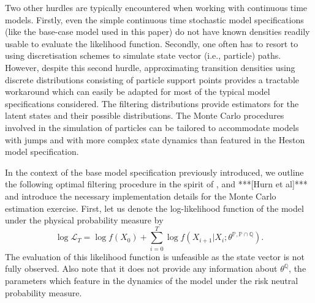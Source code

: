 \documentclass[11pt,a4paper,notitlepage]{article}
\numberwithin{equation}{section}
\begin{document}
Two other hurdles are typically encountered when working with continuous time models. Firstly, even the simple continuous time stochastic model specifications (like the base-case model used in this paper) do not have known densities readily usable to evaluate the likelihood function. Secondly, one often has to resort to using discretisation schemes to simulate state vector (i.e., particle) paths. However, despite this second hurdle, approximating transition densities using discrete distributions consisting of particle support points provides a tractable workaround which can easily be adapted for most of the typical model specifications considered. The filtering distributions provide estimators for the latent states and their possible distributions. The Monte Carlo procedures involved in the simulation of particles can be tailored to accommodate models with jumps and with more complex state dynamics than featured in the Heston model specification. 

In the context of the base model specification previously introduced, we outline the following optimal filtering procedure in the spirit of \citet{johannes2009optimal}, \citet{christoffersen2010volatility} and ***[Hurn et al]*** and introduce the necessary implementation details for the Monte Carlo estimation exercise. First, let us denote the  log-likelihood function of the model under the physical probability measure by
\begin{equation}
\log \mathcal{L}_T = \log f(X_0) + \sum_{i=0}^T \log f(X_{i+1}|X_{i};\theta^{\mathbb{P},\mathbb{P}\cap\mathbb{Q}}).
\end{equation}
The evaluation of this likelihood function is unfeasible as the state vector is not fully observed. Also note that it does not provide any information about $\theta^\mathbb{Q}$, the parameters which feature in the dynamics of the model under the risk neutral probability measure.
 
\end{document}
